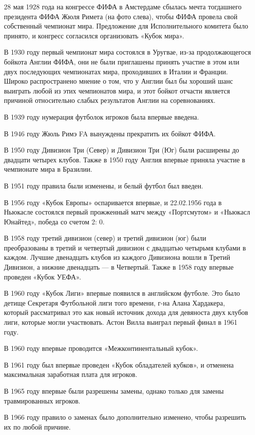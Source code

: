 28 мая 1928 года на конгрессе ФИФА в Амстердаме сбылась мечта тогдашнего президента ФИФА Жюля Римета (на фото слева), чтобы ФИФА провела свой собственный чемпионат мира. Предложение для Исполнительного комитета было принято, и конгресс согласился организовать «Кубок мира».

В 1930 году первый чемпионат мира состоялся в Уругвае, из-за продолжающегося бойкота Англии ФИФА, они не были приглашены принять участие в этом или двух последующих чемпионатах мира, проходивших в Италии и Франции. Широко распространено мнение о том, что у Англии был бы хороший шанс выиграть любой из этих чемпионатов мира, и этот бойкот отчасти является причиной относительно слабых результатов Англии на соревнованиях.

В 1939 году нумерация футболок игроков была впервые введена.

В 1946 году Жюль Римэ FA вынуждены прекратить их бойкот ФИФА.

В 1950 году Дивизион Три (Север) и Дивизион Три (Юг) были расширены до двадцати четырех клубов. Также в 1950 году Англия впервые приняла участие в чемпионате мира в Бразилии.  

В 1951 году правила были изменены, и белый футбол был введен.

В 1956 году «Кубок Европы» оспаривается впервые, и 22.02.1956 года в Ньюкасле состоялся первый прожженный матч между «Портсмутом» и «Ньюкасл Юнайтед», победа со счетом 2: 0.

В 1958 году третий дивизион (север) и третий дивизион (юг) были преобразованы в третий и четвертый дивизион с двадцатью четырьмя клубами в каждом. Лучшие двенадцать клубов из каждого Дивизиона вошли в Третий Дивизион, а нижние двенадцать --- в Четвертый. Также в 1958 году впервые проведен «Кубок УЕФА».

В 1960 году «Кубок Лиги» впервые появился в английском футболе. Это было детище Секретаря Футбольной лиги того времени, г-на Алана Хардакера, который рассматривал это как новый источник дохода для девяноста двух клубов лиги, которые могли участвовать. Астон Вилла выиграл первый финал в 1961 году.

В 1960 году впервые проводится «Межконтинентальный кубок».

В 1961 году  был впервые проведен «Кубок обладателей кубков», и отменена максимальная заработная плата для игроков.

В 1965 году впервые были разрешены замены, однако только для замены травмированных игроков.

В 1966 году правило о заменах было дополнительно изменено, чтобы разрешить их по любой причине.

